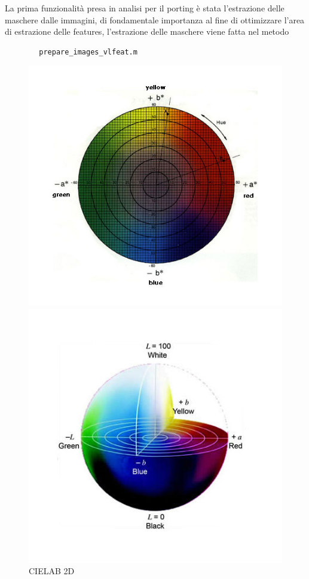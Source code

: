 \documentclass[a4paper,12pt]{report}
\begin{document}
      La prima funzionalità presa in analisi per il porting è stata l'estrazione delle maschere dalle immagini,
      di fondamentale importanza al fine di ottimizzare l'area di estrazione delle features, l'estrazione delle maschere viene fatta
      nel metodo 
      \begin{verbatim}
        prepare_images_vlfeat.m
      \end{verbatim}
      \begin{figure}
        \centering
        
        \begin{minipage}{0.35\textwidth}
          \centering
          \includegraphics[width=\textwidth]{assets/images/cielab2.jpg}  
          \caption{CIELAB 2D}
        \end{minipage}
        \begin{minipage}{0.35\textwidth}
          \centering
          \includegraphics[width=\textwidth]{assets/images/cielab1.jpg}   

\end{minipage}
\end{figure}
\end{document}
